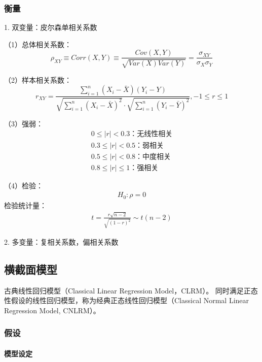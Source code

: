 \documentclass[12pt]{book}
\begin{document}
\subsubsection{衡量}

1. 双变量：皮尔森单相关系数

（1）总体相关系数：
$$
\rho_{XY}\equiv Corr\left(X,Y\right)\equiv\frac{Cov\left(X,Y\right)}{\sqrt{Var\left(X\right)Var\left(Y\right)}}=\frac{\sigma_{XY}}{\sigma_X\sigma_Y}
$$

（2）样本相关系数：
$$
r_{XY} = \frac{\sum_{i=1}^{n}{ (X_i-\bar{X})(Y_i-Y)}}{\sqrt{\sum_{i=1}^{n}{(X_i-\bar{X})^2}}· \sqrt{\sum_{i=1}^{n}{(Y_i-\bar{Y})^2}}  }, -1\leq r \leq 1
$$

（3）强弱：
\begin{align*}
0\le\left|r\right|<0.3：\text{无线性相关} \\ 
0.3\le\left|r\right|<0.5：\text{弱相关} \\ 
0.5\le\left|r\right|<0.8：\text{中度相关} \\ 
0.8\le\left|r\right|\le1：\text{强相关}
\end{align*}


（4）检验：
\begin{gather*}
    H_0: \rho =0
\end{gather*}
检验统计量：
\begin{gather*}
    t = \frac{r\sqrt{n-2}}{\sqrt{(1-r)^2}} \sim t(n-2) 
\end{gather*}


2. 多变量：复相关系数，偏相关系数


\subsection{横截面模型}







古典线性回归模型（Classical Linear Regression Model，CLRM）。 同时满足正态性假设的线性回归模型，称为经典正态线性回归模型（Classical Normal Linear Regression Model, CNLRM）。

\subsubsection{假设}

\paragraph{模型设定}
\end{document}
